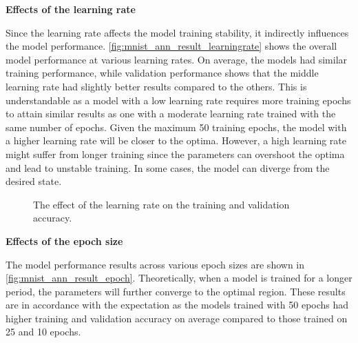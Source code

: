 \documentclass[a4paper]{article}
\begin{document}
\newpage
\textbf{Effects of the learning rate}

Since the learning rate affects the model training stability, it indirectly influences the model performance. \autoref{fig:mnist_ann_result_learningrate} shows the overall model performance at various learning rates. On average, the models had similar training performance, while validation performance shows that the middle learning rate had slightly better results compared to the others. This is understandable as a model with a low learning rate requires more training epochs to attain similar results as one with a moderate learning rate trained with the same number of epochs. Given the maximum 50 training epochs, the model with a higher learning rate will be closer to the optima. However, a high learning rate might suffer from longer training since the parameters can overshoot the optima and lead to unstable training. In some cases, the model can diverge from the desired state. 
\begin{figure} [h!]
    \caption{The effect of the learning rate on the training and validation accuracy.} 
    \label{fig:mnist_ann_result_learningrate}
\end{figure}

\textbf{Effects of the epoch size}

The model performance results across various epoch sizes are shown in \autoref{fig:mnist_ann_result_epoch}. Theoretically, when a model is trained for a longer period, the parameters will further converge to the optimal region. These results are in accordance with the expectation as the models trained with 50 epochs had higher training and validation accuracy on average compared to those trained on 25 and 10 epochs. 
\end{document}
